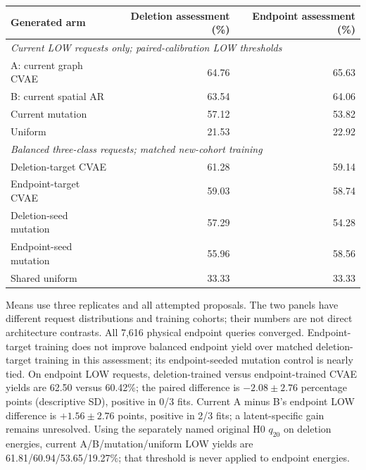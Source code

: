 \begin{center}\small
\begin{tabular}{lrr}\toprule
Generated arm & Deletion assessment (\%) & Endpoint assessment (\%)\\\midrule
\multicolumn{3}{l}{\textit{Current LOW requests only; paired-calibration LOW thresholds}}\\
A: current graph CVAE &64.76&65.63\\
B: current spatial AR &63.54&64.06\\
Current mutation &57.12&53.82\\
Uniform &21.53&22.92\\\midrule
\multicolumn{3}{l}{\textit{Balanced three-class requests; matched new-cohort training}}\\
Deletion-target CVAE &61.28&59.14\\
Endpoint-target CVAE &59.03&58.74\\
Deletion-seed mutation &57.29&54.28\\
Endpoint-seed mutation &55.96&58.56\\
Shared uniform &33.33&33.33\\\bottomrule
\end{tabular}
\end{center}
Means use three replicates and all attempted proposals. The two panels have
different request distributions and training cohorts; their numbers are not
direct architecture contrasts. All 7,616 physical endpoint queries converged.
Endpoint-target training does not improve balanced endpoint yield over matched
deletion-target training in this assessment; its endpoint-seeded mutation control
is nearly tied. On endpoint LOW requests, deletion-trained versus endpoint-trained
CVAE yields are 62.50 versus 60.42\%; the paired difference is $-2.08\pm2.76$
percentage points (descriptive SD), positive in 0/3 fits. Current A minus B's
endpoint LOW difference is $+1.56\pm2.76$ points, positive in 2/3 fits; a
latent-specific gain remains unresolved.
Using the separately named original H0 $q_{20}$ on deletion energies, current
A/B/mutation/uniform LOW yields are 61.81/60.94/53.65/19.27\%; that threshold
is never applied to endpoint energies.
